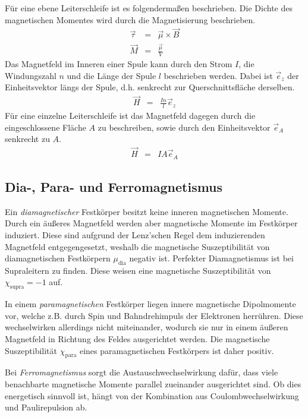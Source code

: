 \documentclass[12pt,a4paper]{scrartcl}
\numberwithin{equation}{section} %
\begin{document}
Für eine ebene Leiterschleife ist es folgendermaßen beschrieben. \cite{Jackson}
Die Dichte des magnetischen Momentes wird durch die Magnetisierung beschrieben.
\begin{eqnarray}
    \vec \tau &=& \vec \mu \times \vec B \\
    \vec M &=& \frac{\vec \mu}{V}
\end{eqnarray}
Das Magnetfeld im Inneren einer Spule kann durch den Strom $I$, die
Windungszahl $n$ und die Länge der Spule $l$ beschrieben werden. Dabei ist $\vec e_z$ der Einheitsvektor längs der Spule, d.h. senkrecht zur Querschnittsfläche derselben. \cite{Jackson}
\begin{eqnarray}
    \vec H &=& \frac{In}{l} \vec e_z \label{H(I)}
\end{eqnarray}
Für eine einzelne Leiterschleife ist das Magnetfeld dagegen durch die eingeschlossene Fläche $A$ zu beschreiben, sowie durch den Einheitsvektor $\vec e_A$ senkrecht zu $A$.
\begin{eqnarray}
    \vec H &=& IA \vec e_A
\end{eqnarray}

\hypertarget{dia--para--und-ferromagnetismus}{%
\subsection{Dia-, Para- und Ferromagnetismus}\label{dia--para--und-ferromagnetismus}}
Ein \emph{diamagnetischer} Festkörper besitzt keine inneren magnetischen Momente. Durch ein äußeres Magnetfeld werden aber magnetische Momente im Festkörper induziert. Diese sind aufgrund der Lenz'schen Regel dem induzierenden Magnetfeld entgegengesetzt, weshalb die magnetische Suszeptibilität von diamagnetischen Festkörpern $\mu_\mathrm{dia}$
negativ ist. Perfekter Diamagnetismus ist bei Supraleitern zu finden. Diese weisen eine magnetische Suszeptibilität von $\chi_\mathrm{supra} = -1$ auf.

In einem \emph{paramagnetischen} Festkörper liegen innere magnetische Dipolmomente vor, welche z.B. durch Spin und Bahndrehimpuls der Elektronen herrühren. Diese wechselwirken allerdings nicht miteinander, wodurch sie nur in einem äußeren Magnetfeld in Richtung des Feldes ausgerichtet werden. Die magnetische Suszeptibilität $\chi_\mathrm{para}$ eines paramagnetischen Festkörpers ist daher positiv.

Bei \emph{Ferromagnetismus} sorgt die Austauschwechselwirkung dafür, dass viele benachbarte magnetische Momente parallel zueinander ausgerichtet sind. Ob dies energetisch sinnvoll ist, hängt von der Kombination aus Coulombwechselwirkung und Paulirepulsion ab.
\end{document}
